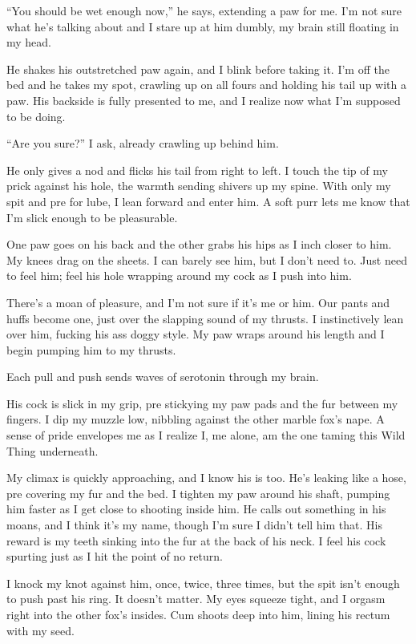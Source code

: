 ``You should be wet enough now,'' he says, extending a paw for me. I'm not
sure what he's talking about and I stare up at him dumbly, my brain
still floating in my head.

He shakes his outstretched paw again, and I blink before taking it. I'm
off the bed and he takes my spot, crawling up on all fours and holding
his tail up with a paw. His backside is fully presented to me, and I
realize now what I'm supposed to be doing.

``Are you sure?'' I ask, already crawling up behind him.

He only gives a nod and flicks his tail from right to left. I touch the
tip of my prick against his hole, the warmth sending shivers up my
spine. With only my spit and pre for lube, I lean forward and enter him.
A soft purr lets me know that I'm slick enough to be pleasurable.

One paw goes on his back and the other grabs his hips as I inch closer
to him. My knees drag on the sheets. I can barely see him, but I don't
need to. Just need to feel him; feel his hole wrapping around my cock as
I push into him.

There's a moan of pleasure, and I'm not sure if it's me or him. Our
pants and huffs become one, just over the slapping sound of my thrusts.
I instinctively lean over him, fucking his ass doggy style. My paw wraps
around his length and I begin pumping him to my thrusts.

Each pull and push sends waves of serotonin through my brain.

His cock is slick in my grip, pre stickying my paw pads and the fur
between my fingers. I dip my muzzle low, nibbling against the other
marble fox's nape. A sense of pride envelopes me as I realize I, me
alone, am the one taming this Wild Thing underneath.

My climax is quickly approaching, and I know his is too. He's leaking
like a hose, pre covering my fur and the bed. I tighten my paw around
his shaft, pumping him faster as I get close to shooting inside him. He
calls out something in his moans, and I think it's my name, though I'm
sure I didn't tell him that. His reward is my teeth sinking into the fur
at the back of his neck. I feel his cock spurting just as I hit the
point of no return.

I knock my knot against him, once, twice, three times, but the spit
isn't enough to push past his ring. It doesn't matter. My eyes squeeze
tight, and I orgasm right into the other fox's insides. Cum shoots deep
into him, lining his rectum with my seed.

